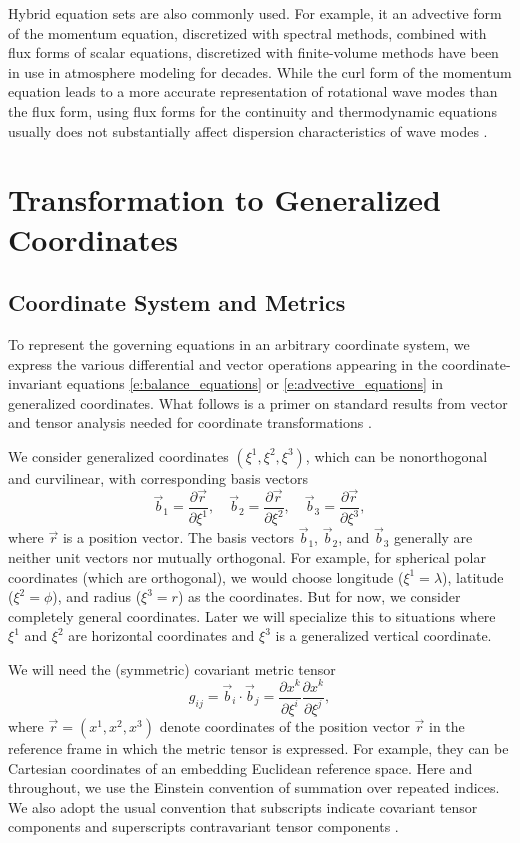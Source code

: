 \documentclass{report}
\begin{document}
Hybrid equation sets are also commonly used. For example, it an advective form of the momentum equation, discretized with spectral methods, combined with flux forms of scalar equations, discretized with finite-volume methods have been in use in atmosphere modeling for decades. While the curl form of the momentum equation leads to a more accurate representation of rotational wave modes than the flux form, using flux forms for the continuity and thermodynamic equations usually does not substantially affect dispersion characteristics of wave modes \citep{Thuburn05n}.

\section{Transformation to Generalized Coordinates}

\subsection{Coordinate System and Metrics}

To represent the governing equations in an arbitrary coordinate system, we express the various differential and vector operations appearing in the coordinate-invariant equations \eqref{e:balance_equations} or \eqref{e:advective_equations} in generalized coordinates. What follows is a  primer on standard results from vector and tensor analysis needed for coordinate transformations \citep[see, e.g.,][chapter~4]{Arfken13}.

We consider generalized coordinates $(\xi^1, \xi^2, \xi^3)$, which can be nonorthogonal and curvilinear, with corresponding basis vectors 
\begin{equation}
\vec{b}_1 = \frac{\partial \vec{r}}{\partial \xi^1}, \quad \vec{b}_2 = \frac{\partial \vec{r}}{\partial \xi^2}, \quad\vec{b}_3 = \frac{\partial \vec{r}}{\partial \xi^3},
\end{equation}
where $\vec{r}$ is a position vector. The basis vectors $\vec{b}_1$, $\vec{b}_2$, and $\vec{b}_3$ generally are neither unit vectors nor mutually orthogonal. For example, for spherical polar coordinates (which are orthogonal), we would choose longitude ($\xi^1 = \lambda$), latitude ($\xi^2 = \phi$), and radius ($\xi^3 = r$) as the coordinates. But for now, we consider completely general coordinates. Later we will specialize this to situations where $\xi^1$ and $\xi^2$ are horizontal coordinates and $\xi^3$ is a generalized vertical coordinate.

We will need the (symmetric) covariant metric tensor
\begin{equation}
    g_{ij} = \vec{b}_i \cdot \vec{b}_j = \frac{\partial x^k}{\partial\xi^i} \frac{\partial x^k}{\partial \xi^j},
\end{equation} 
where $\vec{r} = (x^1, x^2, x^3)$ denote coordinates of the position vector $\vec{r}$ in the reference frame in which the metric tensor is expressed. For example, they can be Cartesian coordinates of an embedding Euclidean reference space. Here and throughout, we use the Einstein convention of summation over repeated indices. We also  adopt the usual convention that subscripts indicate covariant tensor components and superscripts contravariant tensor components \citep[e.g.,][]{Arfken13}. 
\end{document}
